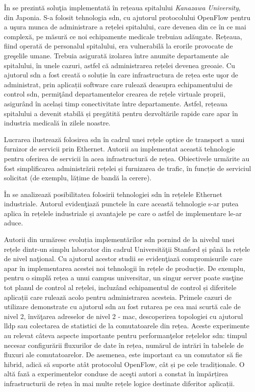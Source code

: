 În \cite{nec2012hospital} se prezintă soluţia implementată în rețeaua spitalului \textit{Kanazawa University}, din Japonia. S-a folosit tehnologia \gls{sdn}, cu ajutorul protocolului OpenFlow pentru a uşura munca de administrare a rețelei spitalului, care devenea din ce în ce mai complexă, pe măsură ce noi echipamente medicale trebuiau adăugate. Rețeaua, fiind operată de personalul spitalului, era vulnerabilă la erorile provocate de greşelile umane. Trebuia asigurată izolarea între anumite departamente ale spitalului, în unele cazuri, astfel că administrarea rețelei devenea greoaie. Cu ajutorul \gls{sdn} a fost creată o soluție în care infrastructura de rețea este uşor de administrat, prin aplicații software care rulează deasupra echipamentului de control \gls{sdn}, permiţând departamentelor crearea de rețele virtuale proprii, asigurând în același timp conectivitate între departamente. Astfel, rețeaua spitalului a devenit stabilă și pregătită pentru dezvoltările rapide care apar în industria medicală în zilele noastre.

Lucrarea \cite{bidkar2014field} ilustrează folosirea \gls{sdn} în cadrul unei rețele optice de transport a unui furnizor de servicii prin Ethernet. Autorii au implementat această tehnologie pentru oferirea de servicii în acea infrastructură de rețea. Obiectivele urmărite au fost simplificarea administrării rețelei și furnizarea de trafic, în funcție de serviciul solicitat (de exemplu, lățime de bandă la cerere).

În \cite{kalman2014applicability} se analizează posibilitatea folosirii tehnologiei \gls{sdn} în rețelele Ethernet industriale. Autorul evidenţiază punctele în care această tehnologie s-ar putea aplica în rețelele industriale și avantajele pe care o astfel de implementare le-ar aduce.

Autorii din \cite{kobayashi2014maturing} urmăresc evoluția implementărilor \gls{sdn} pornind de la nivelul unei rețele dintr-un simplu laborator din cadrul Universităţii Stanford și până la rețele de nivel naţional. Cu ajutorul acestor studii se evidenţiază compromisurile care apar în implementarea acestei noi tehnologii în rețele de producție. De exemplu, pentru o simplă rețea a unui campus universitar, un singur server poate susţine tot planul de control al rețelei, incluzând echipamentul de control și diferitele aplicații care rulează acolo pentru administrarea acesteia. Primele cazuri de utilizare demonstrate cu ajutorul \gls{sdn} au fost rutarea pe cea mai scurtă cale de nivel 2, învăţarea adreselor de nivel 2 - \gls{mac}, descoperirea topologiei cu ajutorul \gls{lldp} sau colectarea de statistici de la comutatoarele din rețea. Aceste experimente au relevat câteva aspecte importante pentru performanţelor rețelelor \gls{sdn}: timpul necesar configurării fluxurilor de date în rețea, numărul de intrări în tabelele de fluxuri ale comutatoarelor. De asemenea, este important ca un comutator să fie hibrid, adică să suporte atât protocolul OpenFlow, cât și pe cele tradiționale. O altă fază a experimentelor conduse de aceşti autori a constat în împărțirea infrastructurii de rețea în mai multe rețele logice destinate diferitor aplicații. 

